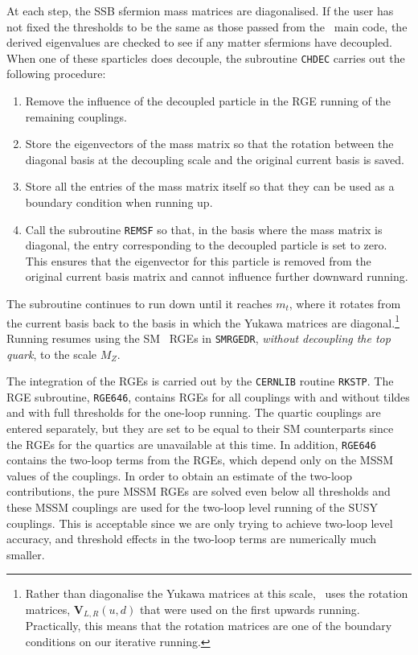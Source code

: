 At each step, the SSB sfermion mass matrices are diagonalised. If the
user has not fixed the thresholds to be the same as those passed from
the \progisasug~main code, the derived eigenvalues are checked to see if
any matter sfermions have decoupled. When one of these sparticles does
decouple, the subroutine \texttt{CHDEC} carries out the following
procedure:
\begin{enumerate}
\item Remove the influence of the decoupled particle in the RGE running of the remaining couplings.
\item Store the eigenvectors of the mass matrix so that the rotation between the diagonal basis at the decoupling scale and the original current basis is saved.
\item Store all the entries of the mass matrix itself so that they can be used as a boundary condition when running up.
\item Call the subroutine \texttt{REMSF} so that, in the basis where the mass matrix is diagonal, the entry corresponding to the decoupled particle is set to zero. This ensures that the eigenvector for this particle is removed from the original current basis matrix and cannot influence further downward running.
\end{enumerate} The subroutine continues to run down until it reaches
$m_{t}$, where it rotates from the current basis back to the basis in
which the Yukawa matrices are diagonal.\footnote{Rather than diagonalise
the Yukawa matrices at this scale, \progrge~uses the rotation matrices,
${\mathbf{V}}_{L,R}(u,d)$ that were used on the first upwards running.
Practically, this means that the rotation matrices are one of the
boundary conditions on our iterative running.} Running resumes using the
SM \drb~RGEs in \texttt{SMRGEDR}, \textit{without decoupling the top
quark}, to the scale $M_{Z}$.

The integration of the RGEs is carried out by the \texttt{CERNLIB}
routine \texttt{RKSTP}. The RGE subroutine, \texttt{RGE646}, contains
RGEs for all couplings with and without tildes and with full thresholds
for the one-loop running. The quartic couplings are entered separately,
but they are set to be equal to their SM counterparts since the RGEs for
the quartics are unavailable at this time. In addition, \texttt{RGE646}
contains the two-loop terms from the RGEs, which depend only on the MSSM
values of the couplings. In order to obtain an estimate of the two-loop
contributions, the pure MSSM RGEs are solved even below all thresholds
and these MSSM couplings are used for the two-loop level running of the
SUSY couplings. This is acceptable since we are only trying to achieve
two-loop level accuracy, and threshold effects in the two-loop terms are
numerically much smaller.

